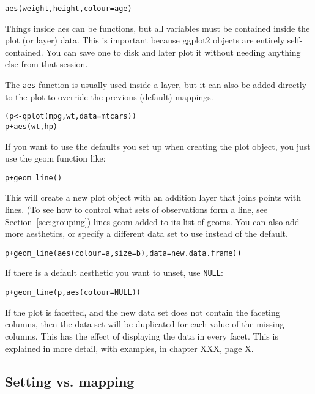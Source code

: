 \begin{alltt}
aes(weight, height, colour = age)
\end{alltt}

Things inside aes can be functions, but all variables must be contained inside the plot (or layer) data.  This is important because ggplot2 objects are entirely self-contained.  You can save one to disk and later plot it without needing anything else from that session.

The {\tt aes} function is usually used inside a layer, but it can also be added directly to the plot to override the previous (default) mappings.  

\begin{alltt}
(p <- qplot(mpg, wt, data=mtcars))
p + aes(wt, hp)
\end{alltt}

If you want to use the defaults you set up when creating the plot object, you just use the geom function like:

\begin{alltt}
p + geom_line()
\end{alltt}

This will create a new plot object with an addition layer that joins points with lines.  (To see how to control what sets of observations form a line, see Section~\ref{sec:grouping}) lines geom added to its list of geoms.   You can also add more aesthetics, or specify a different data set to use instead of the default.  

\begin{alltt}
p + geom_line(aes(colour=a, size=b), data=new.data.frame))
\end{alltt}

If there is a default aesthetic you want to unset, use {\tt NULL}:

\begin{alltt}
p + geom_line(p, aes(colour=NULL))
\end{alltt}

If the plot is facetted, and the new data set does not contain the faceting columns, then the data set will be duplicated for each value of the missing columns.  This has the effect of displaying the data in every facet.  This is explained in more detail, with examples, in chapter XXX, page X.

\subsection{Setting vs. mapping}
\label{sub:setting-mapping}

